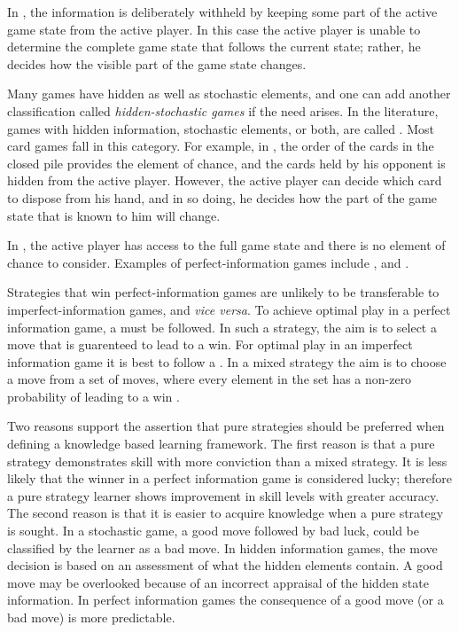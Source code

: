 In , the information is deliberately withheld by keeping some part of the active game state from the active player. In this case the active player is unable to determine the complete game state that follows the current state; rather, he decides how the visible part of the game state changes.   

Many games have hidden as well as stochastic elements, and one can add another classification called {\it hidden-stochastic games} if the need arises.  In the literature, games with hidden information, stochastic elements, or both, are called  . Most card games fall in this category. For example, in , the order of the cards in the closed pile provides the element of chance, and the cards held by his opponent is hidden from the active player.  However, the active player can decide which card to dispose from his hand, and in so doing, he decides how the part of the game state that is known to him will change.  
 
In , the active player has access to the full game state and there is no element of chance to consider.  Examples of perfect-information games include ,  and .  

Strategies that win perfect-information games are unlikely to be transferable to imperfect-information games, and {\it vice versa}. To achieve optimal play in a perfect information game, a   must be followed. In such a strategy, the  aim is to select a move that is guarenteed to lead to a win.  For optimal play in an imperfect information game it is best to follow a .  In a mixed strategy the aim is to choose a move from a set of moves, where every element in the set has a non-zero probability of leading to a win \cite{allis:which}.

Two reasons support the assertion that pure strategies should be preferred when defining a knowledge based learning framework.  The first reason is that a pure strategy demonstrates skill with more conviction than a mixed strategy.  It is less likely that the winner in a perfect information game is considered lucky; therefore  a pure strategy learner shows improvement in skill levels with greater accuracy.  The second reason is that it is easier to acquire knowledge when a pure strategy is sought.  In a stochastic game, a good move followed by bad luck, could be classified by the learner as a bad move.  In hidden information games, the move decision is based on an assessment of what the hidden elements contain. A good move may be overlooked because of an incorrect appraisal of the hidden state information.   In perfect information games the consequence of a good move (or a bad move) is more predictable. 

